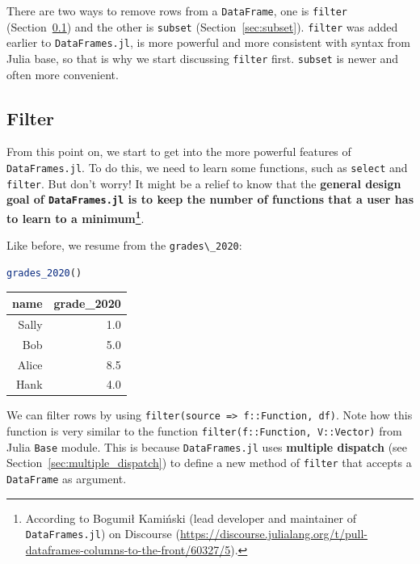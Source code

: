 \documentclass[
  notoc %
]{tufte-book}
\newcommand{\passthrough}[1]{#1}
\begin{document}
There are two ways to remove rows from a
\passthrough{\lstinline!DataFrame!}, one is
\passthrough{\lstinline!filter!} (Section~\ref{sec:filter}) and the
other is \passthrough{\lstinline!subset!} (Section~\ref{sec:subset}).
\passthrough{\lstinline!filter!} was added earlier to
\passthrough{\lstinline!DataFrames.jl!}, is more powerful and more
consistent with syntax from Julia base, so that is why we start
discussing \passthrough{\lstinline!filter!} first.
\passthrough{\lstinline!subset!} is newer and often more convenient.

\hypertarget{sec:filter}{%
\subsection{Filter}\label{sec:filter}}

From this point on, we start to get into the more powerful features of
\passthrough{\lstinline!DataFrames.jl!}. To do this, we need to learn
some functions, such as \passthrough{\lstinline!select!} and
\passthrough{\lstinline!filter!}. But don't worry! It might be a relief
to know that the \textbf{general design goal of
\passthrough{\lstinline!DataFrames.jl!} is to keep the number of
functions that a user has to learn to a minimum\footnote{According to
  Bogumił Kamiński (lead developer and maintainer of
  \passthrough{\lstinline!DataFrames.jl!}) on Discourse
  (\url{https://discourse.julialang.org/t/pull-dataframes-columns-to-the-front/60327/5}).}}.

Like before, we resume from the \passthrough{\lstinline!grades\_2020!}:

\begin{lstlisting}[language=Julia]
grades_2020()
\end{lstlisting}

\begin{longtable}[]{@{}rr@{}}
\toprule
name & grade\_2020 \\
\midrule
\endhead
Sally & 1.0 \\
Bob & 5.0 \\
Alice & 8.5 \\
Hank & 4.0 \\
\bottomrule
\end{longtable}

We can filter rows by using
\passthrough{\lstinline!filter(source => f::Function, df)!}. Note how
this function is very similar to the function
\passthrough{\lstinline!filter(f::Function, V::Vector)!} from Julia
\passthrough{\lstinline!Base!} module. This is because
\passthrough{\lstinline!DataFrames.jl!} uses \textbf{multiple dispatch}
(see Section~\ref{sec:multiple_dispatch}) to define a new method of
\passthrough{\lstinline!filter!} that accepts a
\passthrough{\lstinline!DataFrame!} as argument.
\end{document}
